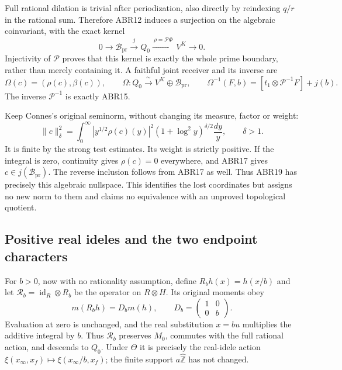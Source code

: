 Full rational dilation is trivial after periodization, also
directly by reindexing $q/r$ in the rational sum. Therefore
ABR12 induces a surjection on the algebraic coinvariant, with
the exact kernel
\begin{equation}\tag{ABR17}
 0\longrightarrow\mathcal B_{\mathrm{pr}}
    \xrightarrow{\ j\ }Q_0
    \xrightarrow{\ \rho=\mathcal P\Phi\ }V^K
    \longrightarrow0.
\end{equation}
Injectivity of $\mathcal P$ proves that this kernel is exactly
the whole prime boundary, rather than merely containing it.
A faithful joint receiver and its inverse are
\begin{equation}\tag{ABR18}
 \Omega(c)=(\rho(c),\beta(c)),\qquad
 \Omega:Q_0\xrightarrow{\ \sim\ }V^K\oplus\mathcal B_{\mathrm{pr}},
 \qquad
 \Omega^{-1}(F,b)=[t_1\otimes\mathcal P^{-1}F]+j(b).
\end{equation}
The inverse $\mathcal P^{-1}$ is exactly ABR15.

Keep Connes's original seminorm, without changing its measure,
factor or weight:
\begin{equation}\tag{ABR19}
 \|c\|_\delta^2
  =\int_0^\infty|y^{1/2}\rho(c)(y)|^2
            (1+\log^2y)^{\delta/2}\frac{dy}{y},\qquad\delta>1.
\end{equation}
It is finite by the strong test estimates. Its weight is strictly
positive. If the integral is zero, continuity gives $\rho(c)=0$
everywhere, and ABR17 gives $c\in j(\mathcal B_{\mathrm{pr}})$.
The reverse inclusion follows from ABR17 as well. Thus ABR19
has precisely this algebraic nullspace. This identifies the
lost coordinates but assigns no new norm to them and claims
no equivalence with an unproved topological quotient.

\subsection{Positive real ideles and the two endpoint characters}

For $b>0$, now with no rationality assumption, define
$R_bh(x)=h(x/b)$ and let $\mathscr R_b=\operatorname{id}_R\otimes R_b$
be the operator on $R\otimes H$.
Its original moments obey
\begin{equation}\tag{ABR19a}
 m(R_bh)=D_bm(h),\qquad
 D_b=\begin{pmatrix}1&0\\0&b\end{pmatrix}.
\end{equation}
Evaluation at zero is unchanged, and the real substitution $x=bu$
multiplies the additive integral by $b$. Thus $\mathscr R_b$
preserves $M_0$, commutes with the full rational action, and
descends to $Q_0$. Under $\Theta$ it is precisely the real-idele
action $\xi(x_\infty,x_f)\mapsto\xi(x_\infty/b,x_f)$; the finite
support $a\widehat{\mathbb Z}$ has not changed.

